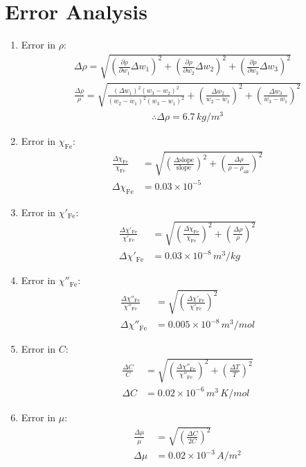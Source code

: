\section{Error Analysis}
\begin{enumerate}
    \item Error in $\rho$:
        \begin{align*}
            \Delta \rho = \sqrt{\left(\frac{\partial \rho}{\partial w_1}\Delta w_1\right)^2 + \left(\frac{\partial \rho}{\partial w_2}\Delta w_2\right)^2 + \left(\frac{\partial \rho}{\partial w_3}\Delta w_3\right)^2}\\          
            \frac{\Delta \rho}{\rho} = \sqrt{\frac{(\Delta w_1)^2(w_3-w_2)^2}{(w_2-w_1)^2(w_3-w_1)^2} + \left(\frac{\Delta w_2}{w_2-w_1}\right)^2 + \left(\frac{\Delta w_3}{w_3-w_1}\right)^2}
        \end{align*}
        \begin{align*}
            \therefore \Delta \rho = 6.7\,kg/m^3
        \end{align*}
    \item Error in $\chi_\text{Fe}$:
        \begin{align*}
            \frac{\Delta \chi_\text{Fe}}{\chi_\text{Fe}} &= \sqrt{\left(\frac{\Delta \text{slope}}{\text{slope}}\right)^2 + \left(\frac{\Delta \rho}{\rho - \rho_\text{air}}\right)^2}\\
            \Delta \chi_\text{Fe} &= 0.03 \times 10^{-5}
        \end{align*}
    \item Error in $\chi'_\text{Fe}$:
        \begin{align*}
            \frac{\Delta \chi'_\text{Fe}}{\chi'_\text{Fe}} &= \sqrt{\left(\frac{\Delta \chi_\text{Fe}}{\chi_\text{Fe}}\right)^2 + \left(\frac{\Delta \rho}{\rho}\right)^2}\\
            \Delta \chi'_\text{Fe} &= 0.03 \times 10^{-8}\,m^3/kg 
        \end{align*}
    \item Error in $\chi''_\text{Fe}$:
        \begin{align*}
            \frac{\Delta \chi''_\text{Fe}}{\chi''_\text{Fe}} &= \sqrt{\left(\frac{\Delta \chi'_\text{Fe}}{\chi'_\text{Fe}}\right)^2}\\
            \Delta \chi''_\text{Fe} &= 0.005 \times 10^{-8}\,m^3/mol 
        \end{align*}
    \item Error in $C$:
        \begin{align*}
            \frac{\Delta C}{C} &= \sqrt{\left(\frac{\Delta \chi''_\text{Fe}}{\chi''_\text{Fe}}\right)^2 + \left(\frac{\Delta T}{T}\right)^2}\\
            \Delta C &= 0.02 \times 10^{-6}\,m^3\,K/mol
        \end{align*}
    \item Error in $\mu$:
        \begin{align*}
            \frac{\Delta \mu}{\mu} &= \sqrt{\left(\frac{\Delta C}{2C}\right)^2}\\
            \Delta \mu &= 0.02 \times 10^{-3}\,A/m^2 
        \end{align*}
\end{enumerate}
